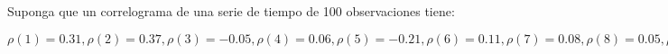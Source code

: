 
\question Suponga que un correlograma de una serie de tiempo de 100 observaciones tiene:

$\rho(1)=0.31,\rho(2)=0.37,\rho(3)=-0.05,\rho(4)=0.06,\rho(5)=-0.21,\rho(6)=0.11,\rho(7)=0.08,\rho(8)=0.05,\rho(9)=0.12,\rho(10)=0.01$
